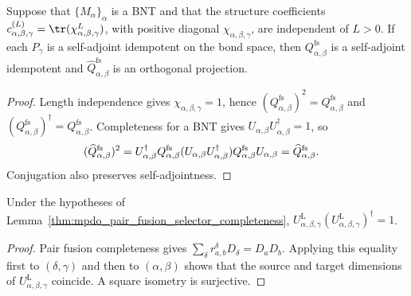 \begin{lemma}%
    \label{thm:mpdo_full_support_virtual_projector_one_fusion}
    \leanok
    Suppose that $\{M_\alpha\}_\alpha$ is a BNT and that the structure
    coefficients
    $c_{\alpha,\beta,\gamma}^{(L)}
        =\tr(\chi_{\alpha,\beta,\gamma}^{L})$,
    with positive diagonal $\chi_{\alpha,\beta,\gamma}$, are independent of
    $L>0$. If each $P_\gamma$ is a self-adjoint idempotent on the bond space,
    then $Q^{\mathrm{fs}}_{\alpha,\beta}$ is a self-adjoint idempotent and
    $\widehat Q^{\mathrm{fs}}_{\alpha,\beta}$ is an orthogonal
    projection.
\end{lemma}
\begin{proof}\leanok
    Length independence gives
    $\chi_{\alpha,\beta,\gamma}=1$, hence
    $(Q^{\mathrm{fs}}_{\alpha,\beta})^2
        =Q^{\mathrm{fs}}_{\alpha,\beta}$ and
    $(Q^{\mathrm{fs}}_{\alpha,\beta})^\dagger
        =Q^{\mathrm{fs}}_{\alpha,\beta}$.
    Completeness for a BNT gives
    $U_{\alpha,\beta}U_{\alpha,\beta}^{\dagger}=1$, so
    \begin{align}
        (\widehat Q^{\mathrm{fs}}_{\alpha,\beta})^2
         & =U_{\alpha,\beta}^{\dagger}Q^{\mathrm{fs}}_{\alpha,\beta}
        (U_{\alpha,\beta}U_{\alpha,\beta}^{\dagger})
        Q^{\mathrm{fs}}_{\alpha,\beta}U_{\alpha,\beta}
        =\widehat Q^{\mathrm{fs}}_{\alpha,\beta}.
        \notag
    \end{align}
    Conjugation also preserves self-adjointness.
\end{proof}

\begin{lemma}%
    \label{thm:mpdo_left_fusion_selector_completeness}
    \leanok
    Under the hypotheses of
    Lemma~\ref{thm:mpdo_pair_fusion_selector_completeness},
    $U^{\mathrm L}_{\alpha,\beta,\gamma}
        (U^{\mathrm L}_{\alpha,\beta,\gamma})^{\dagger}=1$.
\end{lemma}
\begin{proof}\leanok
    Pair fusion completeness gives
    $\sum_\delta r_{a,b}^{\delta}D_\delta=D_aD_b$.
    Applying this equality first to $(\delta,\gamma)$ and then to
    $(\alpha,\beta)$ shows that the source and target dimensions of
    $U^{\mathrm L}_{\alpha,\beta,\gamma}$ coincide. A square isometry is
    surjective.
\end{proof}

